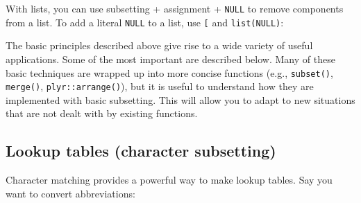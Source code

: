 With lists, you can use subsetting + assignment + \texttt{NULL} to
remove components from a list. To add a literal \texttt{NULL} to a list,
use \texttt{{[}} and \texttt{list(NULL)}:

\begin{Shaded}
\begin{Highlighting}[]
\StringTok{ }\NormalTok{(} \NormalTok{, } \NormalTok{)}
\NormalTok{x[[}\NormalTok{]] <-}\StringTok{ }

\StringTok{ }\NormalTok{(} \NormalTok{)}
\NormalTok{y[}\NormalTok{] <-}\StringTok{ }\NormalTok{(}\NormalTok{)}
\end{Highlighting}
\end{Shaded}


The basic principles described above give rise to a wide variety of
useful applications. Some of the most important are described below.
Many of these basic techniques are wrapped up into more concise
functions (e.g., \texttt{subset()}, \texttt{merge()},
\texttt{plyr::arrange()}), but it is useful to understand how they are
implemented with basic subsetting. This will allow you to adapt to new
situations that are not dealt with by existing functions.

\subsection{Lookup tables (character subsetting)}\label{lookup-tables}

Character matching provides a powerful way to make lookup tables. Say
you want to convert abbreviations: 

